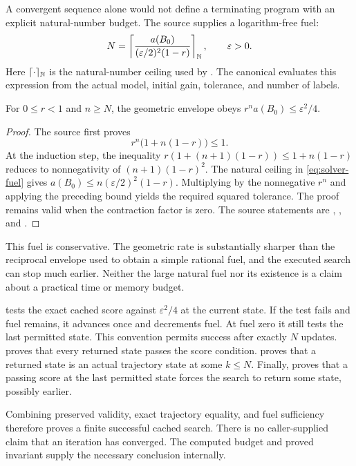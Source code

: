 A convergent sequence alone would not define a terminating program with an
explicit natural-number budget. The source supplies a logarithm-free fuel:
\begin{equation}
 N=\left\lceil
 \frac{a(B_0)}{(\varepsilon/2)^2(1-r)}
 \right\rceil_{\mathbb N},\qquad \varepsilon>0.
 \label{eq:solver-fuel}
\end{equation}
Here $\lceil\cdot\rceil_{\mathbb N}$ is the natural-number ceiling used by
. The canonical  evaluates this expression
from the actual model, initial gain, tolerance, and number of labels.

\begin{lemma}
For $0\le r<1$ and $n\ge N$, the geometric envelope obeys
$r^na(B_0)\le\varepsilon^2/4$.
\end{lemma}
\begin{proof}
The source first proves
\[
 r^n\bigl(1+n(1-r)\bigr)\le1.
\]
At the induction step, the inequality
$r(1+(n+1)(1-r))\le1+n(1-r)$ reduces to nonnegativity of
$(n+1)(1-r)^2$. The natural ceiling in \eqref{eq:solver-fuel} gives
$a(B_0)\le n(\varepsilon/2)^2(1-r)$. Multiplying by the nonnegative
$r^n$ and applying the preceding bound yields the required squared tolerance.
The proof remains valid when the contraction factor is zero. The source
statements are , , and
.
\end{proof}

This fuel is conservative. The geometric rate is substantially sharper than the
reciprocal envelope used to obtain a simple rational fuel, and the executed search
can stop much earlier. Neither the large natural fuel nor its existence is a
claim about a practical time or memory budget.

 tests the exact cached score against $\varepsilon^2/4$ at the current
state. If the test fails and fuel remains, it advances once and decrements fuel.
At fuel zero it still tests the last permitted state. This convention permits
success after exactly $N$ updates.  proves that every returned
state passes the score condition.  proves that a returned
state is an actual trajectory state at some $k\le N$. Finally,
 proves that a passing score at the last permitted state
forces the search to return some state, possibly earlier.

Combining preserved validity, exact trajectory equality, and fuel sufficiency
therefore proves a finite successful cached search. There is no caller-supplied
claim that an iteration has converged. The computed budget and proved invariant
supply the necessary conclusion internally.

